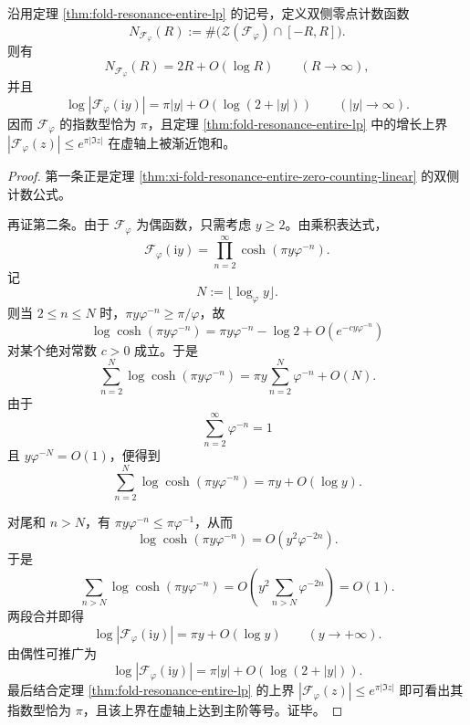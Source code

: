 \begin{theorem}[黄金共振整函数的零点密度与虚轴增长同时达到临界型]\label{thm:xi-time-part9s-resonance-entire-imaginary-axis-saturation}
沿用定理 \ref{thm:fold-resonance-entire-lp} 的记号，定义双侧零点计数函数
\[
N_{\mathcal F_\varphi}(R):=
\#\bigl(\mathcal Z(\mathcal F_\varphi)\cap[-R,R]\bigr).
\]
则有
\[
N_{\mathcal F_\varphi}(R)=2R+O(\log R)
\qquad (R\to\infty),
\]
并且
\[
\log|\mathcal F_\varphi(\mathrm{i}y)|
=
\pi|y|+O(\log(2+|y|))
\qquad (|y|\to\infty).
\]
因而 \(\mathcal F_\varphi\) 的指数型恰为 \(\pi\)，且定理
\ref{thm:fold-resonance-entire-lp} 中的增长上界
\(
|\mathcal F_\varphi(z)|\le e^{\pi|\Im z|}
\)
在虚轴上被渐近饱和。
\end{theorem}
\begin{proof}
第一条正是定理 \ref{thm:xi-fold-resonance-entire-zero-counting-linear} 的双侧计数公式。

再证第二条。由于 \(\mathcal F_\varphi\) 为偶函数，只需考虑 \(y\ge 2\)。由乘积表达式，
\[
\mathcal F_\varphi(\mathrm{i}y)
=
\prod_{n=2}^{\infty}\cosh(\pi y\varphi^{-n}).
\]
记
\[
N:=\lfloor \log_\varphi y\rfloor.
\]
则当 \(2\le n\le N\) 时，\(\pi y\varphi^{-n}\ge \pi/\varphi\)，故
\[
\log\cosh(\pi y\varphi^{-n})
=
\pi y\varphi^{-n}-\log 2+O(e^{-c y\varphi^{-n}})
\]
对某个绝对常数 \(c>0\) 成立。于是
\[
\sum_{n=2}^{N}\log\cosh(\pi y\varphi^{-n})
=
\pi y\sum_{n=2}^{N}\varphi^{-n}+O(N).
\]
由于
\[
\sum_{n=2}^{\infty}\varphi^{-n}=1
\]
且 \(y\varphi^{-N}=O(1)\)，便得到
\[
\sum_{n=2}^{N}\log\cosh(\pi y\varphi^{-n})
=
\pi y+O(\log y).
\]

对尾和 \(n>N\)，有 \(\pi y\varphi^{-n}\le \pi\varphi^{-1}\)，从而
\[
\log\cosh(\pi y\varphi^{-n})=O(y^2\varphi^{-2n}).
\]
于是
\[
\sum_{n>N}\log\cosh(\pi y\varphi^{-n})
=
O\!\left(y^2\sum_{n>N}\varphi^{-2n}\right)
=
O(1).
\]
两段合并即得
\[
\log|\mathcal F_\varphi(\mathrm{i}y)|
=
\pi y+O(\log y)
\qquad (y\to+\infty).
\]
由偶性可推广为
\[
\log|\mathcal F_\varphi(\mathrm{i}y)|
=
\pi|y|+O(\log(2+|y|)).
\]
最后结合定理 \ref{thm:fold-resonance-entire-lp} 的上界
\(
|\mathcal F_\varphi(z)|\le e^{\pi|\Im z|}
\)
即可看出其指数型恰为 \(\pi\)，且该上界在虚轴上达到主阶等号。证毕。
\end{proof}


